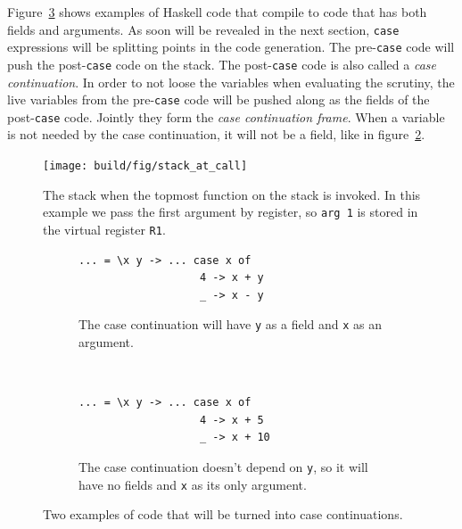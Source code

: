 Figure~\ref{fig:field_and_arguments} shows examples of Haskell code
that compile to code that has both fields and arguments. As soon will
be revealed in the next section, \texttt{case} expressions will be
splitting points in the code generation. The pre-\texttt{case} code will
push the post-\texttt{case} code on the stack. The post-\texttt{case}
code is also called a \emph{case continuation}. In order to not loose
the variables when evaluating the scrutiny, the live variables from
the pre-\texttt{case} code will be pushed along as the fields of the
post-\texttt{case} code. Jointly they form the \emph{case continuation
frame}. When a variable is not needed by the case continuation, it
will not be a field, like in figure~\ref{fig:no_fields}.

\begin{figure}
\begin{mdframed}
  \texttt{[image: build/fig/stack\_at\_call]}
  \caption{The stack when the topmost function on the stack is invoked.  In
    this example we pass the first argument by register, so \texttt{arg 1} is
    stored in the virtual register \texttt{R1}.}
  \label{fig:stack_at_call}
\end{mdframed}
\end{figure}

\begin{figure}
\begin{mdframed}
        \begin{subfigure}[t]{0.5\textwidth}
          \begin{verbatim}
... = \x y -> ... case x of
                   4 -> x + y
                   _ -> x - y
          \end{verbatim}
          \caption{The case continuation will have \texttt{y} as a field and
            \texttt{x} as an argument.}
        \end{subfigure}
    ~ %
        \begin{subfigure}[t]{0.5\textwidth}
          \begin{verbatim}
... = \x y -> ... case x of
                   4 -> x + 5
                   _ -> x + 10
          \end{verbatim}
          \caption{The case continuation doesn't depend on \texttt{y}, so it
            will have no fields and \texttt{x} as its only argument.}
          \label{fig:no_fields}
        \end{subfigure}
  \caption{Two examples of code that will be turned into case continuations.}
  \label{fig:field_and_arguments}
\end{mdframed}
\end{figure}

